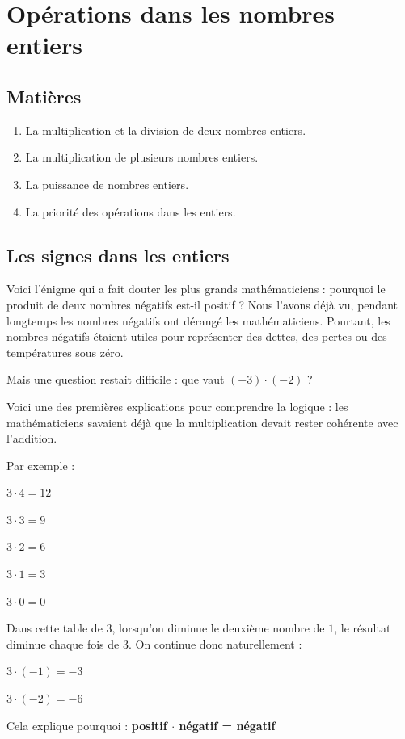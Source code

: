 \documentclass[../../syllabus_1.tex]{subfiles}
\begin{document}
\chapter{Opérations dans les nombres entiers}

\section*{Matières}
\begin{enumerate}[label=\textbf{\arabic*.}]
    \item La multiplication et la division de deux nombres entiers.
    \item La multiplication de plusieurs nombres entiers.
    \item La puissance de nombres entiers.
    \item La priorité des opérations dans les entiers.
\end{enumerate}

\section{Les signes dans les entiers}
Voici l'énigme qui a fait douter les plus grands mathématiciens : pourquoi le produit de deux nombres négatifs est-il positif ? Nous l'avons déjà vu, pendant longtemps les nombres négatifs ont dérangé les mathématiciens.
Pourtant, les nombres négatifs étaient utiles pour représenter des dettes, des pertes ou des températures sous zéro.

Mais une question restait difficile : que vaut \((-3) \cdot (-2) \) ?

Voici une des premières explications pour comprendre la logique : les mathématiciens savaient déjà que la multiplication devait rester cohérente avec l'addition.

Par exemple :

\(3 \cdot 4 = 12 \)

\(3 \cdot 3 = 9 \)

\(3 \cdot 2 = 6 \)

\(3 \cdot 1 = 3 \)

\(3 \cdot 0 = 0 \)

Dans cette table de $3$, lorsqu'on diminue le deuxième nombre de $1$, le résultat diminue chaque fois de $3$.
On continue donc naturellement :

\(3 \cdot (-1) = -3 \)

\(3 \cdot (-2) = -6 \)

Cela explique pourquoi :
\textbf{positif \(\cdot \) négatif = négatif}
\end{document}
